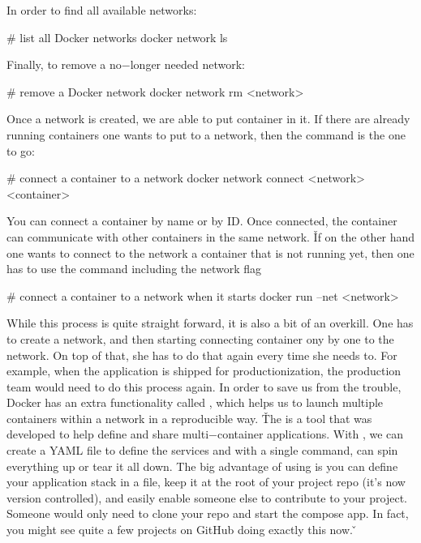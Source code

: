 In order to find all available networks:

\begin{bash}
# list all Docker networks
docker network ls
\end{bash}

Finally, to remove a no$-$longer needed network:

\begin{bash}
# remove a Docker network
docker network rm <network>
\end{bash}

Once a network is created, we are able to put container in it. If there are already running containers one wants to
put to a network, then the  command is the one to go:

\begin{bash}
# connect a container to a network
docker network connect <network> <container>
\end{bash}

You can connect a container by name or by ID. Once connected, the container can communicate with other containers in
the same network. \v

If on the other hand one wants to connect to the network a container that is not running yet, then one has to use the
 command including the network  flag

\begin{bash}
# connect a container to a network when it starts
docker run --net <network>
\end{bash}

While this process is quite straight forward, it is also a bit of an overkill. One has to create a network, and then
starting connecting container ony by one to the network. On top of that, she has to do that again every time she
needs to. For example, when the application is shipped for productionization, the production team would need to do
this process again. In order to save us from the trouble, Docker has an extra functionality called , which helps us to launch multiple containers within a network in a reproducible way. \v

The  is a tool that was developed to help define and share multi$-$container applications. With
, we can create a YAML file to define the services and with a single command, can spin
everything up or tear it all down. The big advantage of using  is you can define your
application stack in a file, keep it at the root of your project repo (it’s now version controlled), and easily
enable someone else to contribute to your project. Someone would only need to clone your repo and start the compose
app. In fact, you might see quite a few projects on GitHub doing exactly this now. \v

